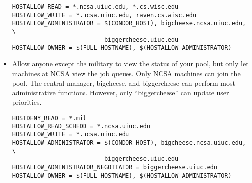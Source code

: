 \begin{itemize}
\begin{verbatim}
HOSTALLOW_READ = *.ncsa.uiuc.edu, *.cs.wisc.edu
HOSTALLOW_WRITE = *.ncsa.uiuc.edu, raven.cs.wisc.edu
HOSTALLOW_ADMINISTRATOR = $(CONDOR_HOST), bigcheese.ncsa.uiuc.edu, \
                          biggercheese.uiuc.edu
HOSTALLOW_OWNER = $(FULL_HOSTNAME), $(HOSTALLOW_ADMINISTRATOR)
\end{verbatim}

\item Allow anyone except the military to view the status of your
pool, but only let machines at NCSA view the job queues.  Only NCSA
machines can join the pool. The central manager, bigcheese, and
biggercheese can perform most administrative functions.  However, only
``biggercheese'' can update user priorities.

\begin{verbatim}
HOSTDENY_READ = *.mil
HOSTALLOW_READ_SCHEDD = *.ncsa.uiuc.edu 
HOSTALLOW_WRITE = *.ncsa.uiuc.edu
HOSTALLOW_ADMINISTRATOR = $(CONDOR_HOST), bigcheese.ncsa.uiuc.edu, \
                          biggercheese.uiuc.edu
HOSTALLOW_ADMINISTRATOR_NEGOTIATOR = biggercheese.uiuc.edu
HOSTALLOW_OWNER = $(FULL_HOSTNAME), $(HOSTALLOW_ADMINISTRATOR)
\end{verbatim}

\end{itemize}
